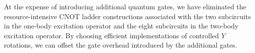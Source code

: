 At the expense of introducing additional quantum gates, we have eliminated the resource-intensive CNOT ladder constructions associated with the two subcircuits in the one-body excitation operator and the eight subcircuits in the two-body excitation operator. By choosing efficient implementations of controlled $Y$ rotations, we can offset the gate overhead introduced by the additional gates.







